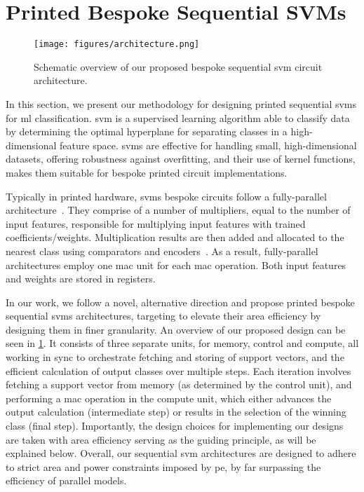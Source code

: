 \section{Printed Bespoke Sequential SVMs}
\label{sec:svm}
\begin{figure}[!t]
    \centering
    \texttt{[image: figures/architecture.png]}
    \caption{Schematic overview of our proposed bespoke sequential \gls{svm} circuit architecture.}
    \label{fig:architecture}
\end{figure}

In this section, we present our methodology for designing printed sequential \glspl{svm} for \gls{ml} classification.
\gls{svm} is a supervised learning algorithm able to classify data by determining the optimal hyperplane for separating classes in a high-dimensional feature space.
\glspl{svm} are effective for handling small, high-dimensional datasets, offering robustness against overfitting, and their use of kernel functions, makes them suitable for bespoke printed circuit implementations.

Typically in printed hardware, \glspl{svm} bespoke circuits follow a fully-parallel architecture~\cite{Mubarik:MICRO:2020:printedml, Armeniakos:DATE2022:axml}.
They comprise of a number of multipliers, equal to the number of input features, responsible for multiplying input features with trained coefficients/weights.
Multiplication results are then added and allocated to the nearest class using comparators and encoders~\cite{Mubarik:MICRO:2020:printedml}.
As a result, fully-parallel architectures employ one \gls{mac} unit for each \gls{mac} operation.
Both input features and weights are stored in registers.

In our work, we follow a novel, alternative direction and propose printed bespoke sequential \glspl{svm} architectures, targeting to elevate their area efficiency by designing them in finer granularity.
An overview of our proposed design can be seen in \cref{fig:architecture}.
It consists of three separate units, for memory, control and compute, all working in sync to orchestrate fetching and storing of support vectors, and the efficient calculation of output classes over multiple steps.
Each iteration involves fetching a support vector from memory (as determined by the control unit), and performing a \gls{mac} operation in the compute unit, which either advances the output calculation (intermediate step) or results in the selection of the winning class (final step).
Importantly, the design choices for implementing our designs are taken with area efficiency serving as the guiding principle, as will be explained below.
Overall, our sequential \gls{svm} architectures are designed to adhere to strict area and power constraints imposed by \gls{pe}, by far surpassing the efficiency of parallel models.


